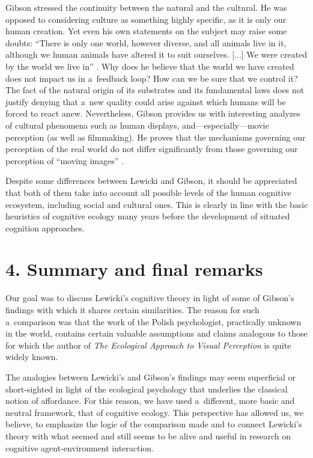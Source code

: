 Gibson stressed the continuity between the natural and the cultural. He was opposed to considering culture as something highly specific, as it is only our human creation. Yet even his own statements on the subject may raise some doubts: ``There is only one world, however diverse, and all animals live in it, although we human animals have altered it to suit ourselves. [...] We were created by the world we live in'' 
\parencite[][p.130]{gibson_ecological_1979}. %
 Why does he believe that the world we have created does not impact us in a~feedback loop? How can we be sure that we control it? The fact of the natural origin of its substrates and its fundamental laws does not justify denying that a~new quality could arise against which humans will be forced to react anew. Nevertheless, Gibson provides us with interesting analyzes of cultural phenomena such as human displays, and---especially---movie perception (as well as filmmaking). He proves that the mechanisms governing our perception of the real world do not differ significantly from those governing our perception of ``moving images'' 
\parencites[][]{gibson_senses_1966}[][]{gibson_ecological_1979}.%




Despite some differences between Lewicki and Gibson, it should be appreciated that both of them take into account all possible levels of the human cognitive ecosystem, including social and cultural ones. This is clearly in line with the basic heuristics of cognitive ecology many years before the development of situated cognition approaches.



\section*{4. Summary and final remarks}

Our goal was to discuss Lewicki's cognitive theory in light of some of Gibson's findings with which it shares certain similarities. The reason for such a~comparison was that the work of the Polish psychologist, practically unknown in the world, contains certain valuable assumptions and claims analogous to those for which the author of \textit{The Ecological Approach to Visual Perception} is quite widely known.



The analogies between Lewicki's and Gibson's findings may seem superficial or short-sighted in light of the ecological psychology that underlies the classical notion of affordance. For this reason, we have used a~different, more basic and neutral framework, that of cognitive ecology. This perspective has allowed us, we believe, to emphasize the logic of the comparison made and to connect Lewicki's theory with what seemed and still seems to be alive and useful in research on cognitive agent-environment interaction.



